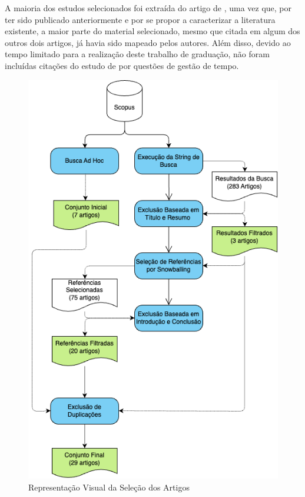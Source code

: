 A maioria dos estudos selecionados foi extraída do artigo de , uma vez que, por ter sido publicado anteriormente e por se propor a caracterizar a literatura existente, a maior parte do material selecionado, mesmo que citada em algum dos outros dois artigos, já havia sido mapeado pelos autores. Além disso, devido ao tempo limitado para a realização deste trabalho de graduação, não foram incluídas citações do estudo de  por questões de gestão de tempo.

\begin{figure}
    \centering
    \caption{Representação Visual da Seleção dos Artigos}
    \includegraphics[width=0.7\linewidth]{figuras/selecao.png}
    \begin{center}
    \end{center}
    \label{fig:selecao}
\end{figure}

